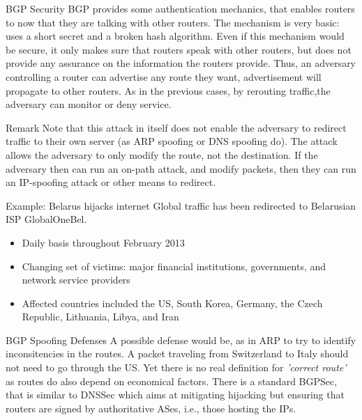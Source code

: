\begin{parag}{BGP Security}
    BGP provides some authentication mechanics, that enables routers to now that they are talking with other routers. The mechanism is very basic: uses a short secret and a broken hash algorithm. Even if this mechanism would be secure, it only makes sure that routers speak with other routers, but does not provide any assurance on the information the routers provide. Thus, an adversary controlling a router can advertise any route they want, advertisement will propagate to other routers. As in the previous cases, by rerouting traffic,the adversary can monitor or deny service.
	\begin{subparag}{Remark}
	    Note that this attack in itself does not enable the adversary to redirect traffic to their own server (as ARP spoofing or DNS spoofing do). The attack allows the adversary to only modify the route, not the destination. If the adversary then can run an on-path attack, and modify packets, then they can run an IP-spoofing attack or other means to redirect.
	\end{subparag}
	\begin{subparag}{Example: Belarus hijacks internet}
	    Global traffic has been redirected to Belarusian ISP GlobalOneBel.
		\begin{itemize}
		    \item Daily basis throughout February 2013
		    \item Changing set of victims: major financial institutions, governments, and network service providers
		    \item Affected countries included the US, South Korea, Germany, the Czech Republic, Lithuania, Libya, and Iran
		\end{itemize}
	\end{subparag}
\end{parag}
\begin{parag}{BGP Spoofing Defenses}
    A possible defense would be, as in ARP to try to identify inconsitencies in the routes. A packet traveling from Switzerland to Italy should not need to go through the US. Yet there is no real definition for \textit{'correct route'} as routes do also depend on economical factors. There is a standard BGPSec, that is similar to DNSSec which aims at mitigating hijacking but ensuring that routers are signed by authoritative ASes, i.e., those hosting the IPs.
\end{parag}

